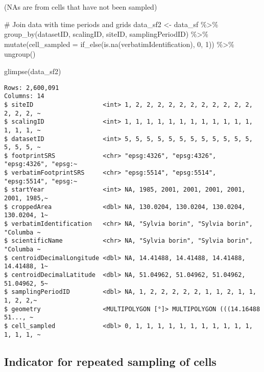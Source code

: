 \documentclass[
  letterpaper,
  DIV=11,
  numbers=noendperiod]{scrreprt}
\newenvironment{Shaded}{\begin{snugshade}}{\end{snugshade}}
\newcommand{\AttributeTok}[1]{\textcolor[rgb]{0.40,0.45,0.13}{#1}}
\newcommand{\CommentTok}[1]{\textcolor[rgb]{0.37,0.37,0.37}{#1}}
\newcommand{\DecValTok}[1]{\textcolor[rgb]{0.68,0.00,0.00}{#1}}
\newcommand{\FunctionTok}[1]{\textcolor[rgb]{0.28,0.35,0.67}{#1}}
\newcommand{\NormalTok}[1]{\textcolor[rgb]{0.00,0.23,0.31}{#1}}
\newcommand{\OtherTok}[1]{\textcolor[rgb]{0.00,0.23,0.31}{#1}}
\newcommand{\SpecialCharTok}[1]{\textcolor[rgb]{0.37,0.37,0.37}{#1}}
\begin{document}
(NAs are from cells that have not been sampled)

\begin{Shaded}
\begin{Highlighting}[]
\CommentTok{\# Join data with time periods and grids}
\NormalTok{data\_sf2 }\OtherTok{\textless{}{-}}\NormalTok{ data\_sf }\SpecialCharTok{\%\textgreater{}\%}
  \FunctionTok{group\_by}\NormalTok{(datasetID, scalingID, siteID, samplingPeriodID) }\SpecialCharTok{\%\textgreater{}\%}
  \FunctionTok{mutate}\NormalTok{(}\AttributeTok{cell\_sampled =} \FunctionTok{if\_else}\NormalTok{(}\FunctionTok{is.na}\NormalTok{(verbatimIdentification), }\DecValTok{0}\NormalTok{, }\DecValTok{1}\NormalTok{)) }\SpecialCharTok{\%\textgreater{}\%}
  \FunctionTok{ungroup}\NormalTok{()}

\FunctionTok{glimpse}\NormalTok{(data\_sf2)}
\end{Highlighting}
\end{Shaded}

\begin{verbatim}
Rows: 2,600,091
Columns: 14
$ siteID                   <int> 1, 2, 2, 2, 2, 2, 2, 2, 2, 2, 2, 2, 2, 2, 2, ~
$ scalingID                <int> 1, 1, 1, 1, 1, 1, 1, 1, 1, 1, 1, 1, 1, 1, 1, ~
$ datasetID                <int> 5, 5, 5, 5, 5, 5, 5, 5, 5, 5, 5, 5, 5, 5, 5, ~
$ footprintSRS             <chr> "epsg:4326", "epsg:4326", "epsg:4326", "epsg:~
$ verbatimFootprintSRS     <chr> "epsg:5514", "epsg:5514", "epsg:5514", "epsg:~
$ startYear                <int> NA, 1985, 2001, 2001, 2001, 2001, 2001, 1985,~
$ croppedArea              <dbl> NA, 130.0204, 130.0204, 130.0204, 130.0204, 1~
$ verbatimIdentification   <chr> NA, "Sylvia borin", "Sylvia borin", "Columba ~
$ scientificName           <chr> NA, "Sylvia borin", "Sylvia borin", "Columba ~
$ centroidDecimalLongitude <dbl> NA, 14.41488, 14.41488, 14.41488, 14.41488, 1~
$ centroidDecimalLatitude  <dbl> NA, 51.04962, 51.04962, 51.04962, 51.04962, 5~
$ samplingPeriodID         <dbl> NA, 1, 2, 2, 2, 2, 2, 1, 1, 2, 1, 1, 1, 2, 2,~
$ geometry                 <MULTIPOLYGON [°]> MULTIPOLYGON (((14.16488 51..., ~
$ cell_sampled             <dbl> 0, 1, 1, 1, 1, 1, 1, 1, 1, 1, 1, 1, 1, 1, 1, ~
\end{verbatim}

\hypertarget{indicator-for-repeated-sampling-of-cells}{%
\subsection{Indicator for repeated sampling of
cells}\label{indicator-for-repeated-sampling-of-cells}}
\end{document}
